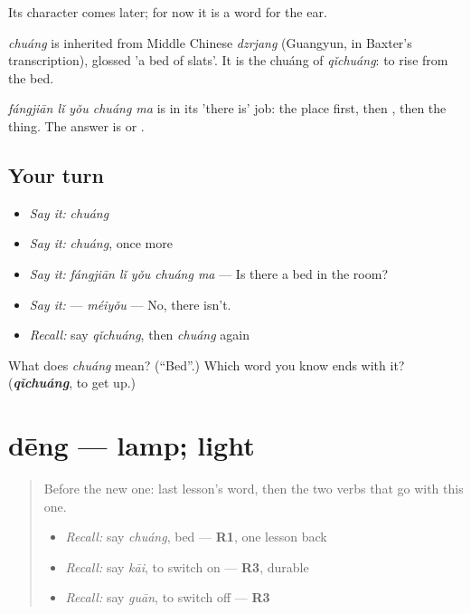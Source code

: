 Its character comes later; for now it is a word for the ear.

\begin{cousinweb}
\emph{chuáng} is inherited from Middle Chinese \emph{dzrjang} (Guangyun, in Baxter's transcription), glossed 'a bed of slats'. It is the chuáng of \emph{qǐchuáng}: to rise from the bed.
\end{cousinweb}

\begin{grammarlens}[title={What you've built}]
\emph{fángjiān lǐ yǒu chuáng ma} is  in its 'there is' job: the place first, then , then the thing. The answer is  or .
\end{grammarlens}

\subsection*{Your turn}
\begin{itemize}
\raggedright
  \item \emph{Say it:} \emph{chuáng}
  \item \emph{Say it:} \emph{chuáng}, once more
  \item \emph{Say it:} \emph{fángjiān lǐ yǒu chuáng ma} — Is there a bed in the room?
  \item \emph{Say it:}  — \emph{méiyǒu} — No, there isn't.
  \item \emph{Recall:} say \emph{qǐchuáng}, then \emph{chuáng} again
\end{itemize}

\begin{tcolorbox}[breakable,colback=teal!4,colframe=teal!35!black,title={Before you move on}]
What does \emph{chuáng} mean? (\textquotedblleft{}Bed\textquotedblright{}.) Which word you know ends with it? (\emph{\textbf{qǐchuáng}}, to get up.)
\end{tcolorbox}
\section[dēng]{dēng — lamp; light}

\label{lesson:ZH-C87-deng}



\begin{quote}
Before the new one: last lesson's word, then the two verbs that go with this one.

\begin{itemize}
\raggedright
  \item \emph{Recall:} say \emph{chuáng}, bed — \textbf{R1}, one lesson back
  \item \emph{Recall:} say \emph{kāi}, to switch on — \textbf{R3}, durable
  \item \emph{Recall:} say \emph{guān}, to switch off — \textbf{R3}
\end{itemize}
\end{quote}


